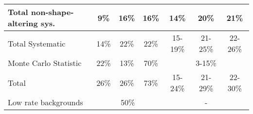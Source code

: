 \begin{table}[!htb]
\begin{center}
{\begin{tabular}{|l|ccc|ccc|}
Total non-shape-altering sys. & 9\% & 16\% & 16\% & 14\% &20\%& 21\% \\\hline
Total Systematic&  14\% & 22\%  & 22\%& 15-19\% & 21-25\%  & 22-26\%\\\hline
Monte Carlo Statistic & 22\% & 13\% & 70\% & \multicolumn{3}{c|}{3-15\%} \\\hline
Total& 26\% & 26\%  & 73\%& 15-24\% & 21-29\%  & 22-30\%\\\hline
Low rate backgrounds &\multicolumn{3}{c|}{50\%}&\multicolumn{3}{c|}{-}\\\hline
\hline
\end{tabular}
}
\label{Tab.SYS}
\end{center}
\end{table}
